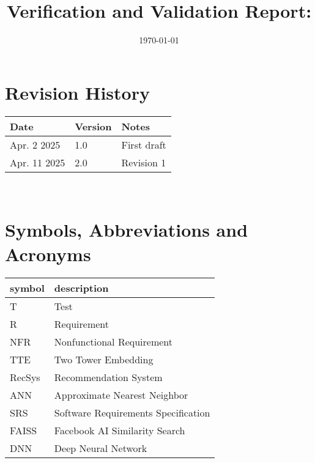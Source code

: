 \documentclass[12pt, titlepage]{article}
\begin{document}
\title{Verification and Validation Report: \progname} 
\author{\authname}
\date{\today}
	
\maketitle


\section{Revision History}

\begin{tabularx}{\textwidth}{p{3cm}p{2cm}X}
\toprule {\bf Date} & {\bf Version} & {\bf Notes}\\
\midrule
Apr. 2 2025 & 1.0 & First draft\\
Apr. 11 2025 & 2.0 & Revision 1\\
\bottomrule
\end{tabularx}
\nocite{*}
~\newpage

\section{Symbols, Abbreviations and Acronyms}

\renewcommand{\arraystretch}{1.2}
\begin{tabular}{l l} 
  \toprule		
  \textbf{symbol} & \textbf{description}\\
  \midrule 
  T & Test\\
  R & Requirement\\
  NFR & Nonfunctional Requirement\\
  TTE & Two Tower Embedding\\
  RecSys & Recommendation System\\
  ANN & Approximate Nearest Neighbor\\
  SRS & Software Requirements Specification\\
  FAISS & Facebook AI Similarity Search\\
  DNN & Deep Neural Network\\
  \bottomrule
\end{tabular}\\


\newpage

\tableofcontents

\listoftables %

\newpage

\end{document}
